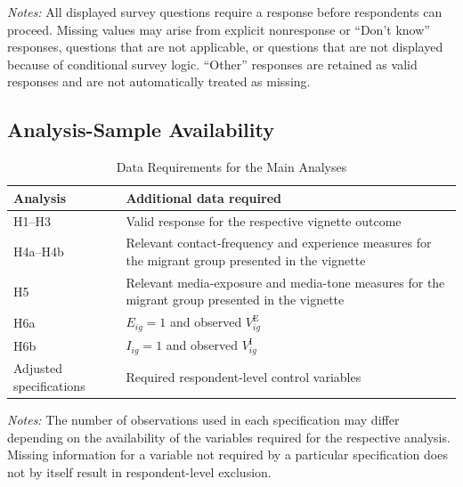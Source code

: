 \begin{table}[H]
\vspace{0.5em}

\begin{minipage}{\textwidth}
\footnotesize
\textit{Notes:} All displayed survey questions require a response before 
respondents can proceed. Missing values may arise from explicit nonresponse
or ``Don't know'' responses, questions that are not applicable, or questions
that are not displayed because of conditional survey logic. ``Other''
responses are retained as valid responses and are not automatically treated
as missing.
\end{minipage}

\end{table}

\subsection{Analysis-Sample Availability}

\begin{table}[H]
\centering
\caption{Data Requirements for the Main Analyses}
\label{tab:analysis_sample}

\small

\begin{tabularx}{\textwidth}{
    >{\raggedright\arraybackslash}p{3.5cm}
    >{\raggedright\arraybackslash}X
}
\toprule
\textbf{Analysis} & \textbf{Additional data required} \\
\midrule

H1--H3
&
Valid response for the respective vignette outcome
\\
\addlinespace

H4a--H4b
&
Relevant contact-frequency and experience measures for the migrant group presented in the vignette
\\
\addlinespace

H5
&
Relevant media-exposure and media-tone measures for the migrant group presented in the vignette
\\
\addlinespace

H6a
&
\(E_{ig}=1\) and observed \(V_{ig}^{\mathrm{E}}\)
\\
\addlinespace

H6b
&
\(I_{ig}=1\) and observed \(V_{ig}^{\mathrm{I}}\)
\\
\addlinespace

Adjusted specifications
&
Required respondent-level control variables
\\
\bottomrule
\end{tabularx}

\vspace{0.5em}

\begin{minipage}{\textwidth}
\footnotesize
\textit{Notes:} The number of observations used in each specification may differ depending on the availability of the variables required for the respective analysis. Missing information for a variable not required by a particular specification does not by itself result in respondent-level exclusion.
\end{minipage}

\end{table}